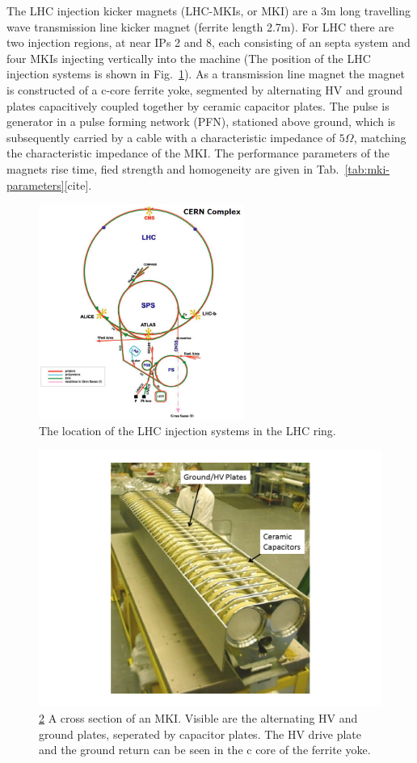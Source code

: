 The LHC injection kicker magnets (LHC-MKIs, or MKI) are a 3m long travelling wave transmission line kicker magnet (ferrite length 2.7m). For LHC there are two injection regions, at near IPs 2 and 8, each consisting of an septa system and four MKIs injecting vertically into the machine (The position of the LHC injection systems is shown in Fig.~\ref{fig:lhc-injection-systems}). As a transmission line magnet the magnet is constructed of a c-core ferrite yoke, segmented by alternating HV and ground plates capacitively coupled together by ceramic capacitor plates. The pulse is generator in a pulse forming network (PFN), stationed above ground, which is subsequently carried by a cable with a characteristic impedance of $5 \Omega$, matching the characteristic impedance of the MKI. The performance parameters of the magnets rise time, fied strength and homogeneity are given in Tab.~\ref{tab:mki-parameters}[cite].

\begin{figure}
\begin{center}
\includegraphics[width=0.6\textwidth]{LHC_MKI/figures/injection-points-lhc.png}
\end{center}
\label{fig:lhc-injection-systems}
\caption{The location of the LHC injection systems in the LHC ring.}
\end{figure}


\begin{figure}
\begin{center}
\includegraphics[height=0.4\textwidth]{LHC_MKI/figures/mki-out-vac-tank.png}
\end{center}
\label{fig:lhc-mki-cross-section}
\caption{\ref{fig:lhc-mki-cross-section} A cross section of an MKI. Visible are the alternating HV and ground plates, seperated by capacitor plates. The HV drive plate and the ground return can be seen in the c core of the ferrite yoke.}
\end{figure}

